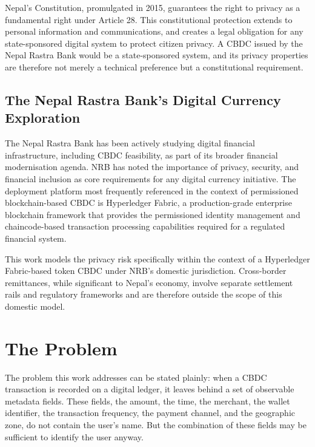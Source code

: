 Nepal's Constitution, promulgated in 2015, guarantees the
right to privacy as a fundamental right under Article 28.
This constitutional protection extends to personal
information and communications, and creates a legal
obligation for any state-sponsored digital system to
protect citizen privacy. A CBDC issued by the Nepal Rastra
Bank would be a state-sponsored system, and its privacy
properties are therefore not merely a technical preference
but a constitutional requirement.

\subsection{The Nepal Rastra Bank's Digital Currency Exploration}

The Nepal Rastra Bank has been actively studying digital
financial infrastructure, including CBDC feasibility, as
part of its broader financial modernisation agenda. NRB
has noted the importance of privacy, security, and
financial inclusion as core requirements for any digital
currency initiative. The deployment platform most
frequently referenced in the context of permissioned
blockchain-based CBDC is Hyperledger Fabric, a
production-grade enterprise blockchain framework that
provides the permissioned identity management and
chaincode-based transaction processing capabilities
required for a regulated financial system.

This work models the privacy risk specifically within
the context of a Hyperledger Fabric-based token CBDC
under NRB's domestic jurisdiction. Cross-border
remittances, while significant to Nepal's economy,
involve separate settlement rails and regulatory
frameworks and are therefore outside the scope of this
domestic model.

\section{The Problem}
\label{sec:problem}

The problem this work addresses can be stated plainly:
when a CBDC transaction is recorded on a digital ledger,
it leaves behind a set of observable metadata fields.
These fields, the amount, the time, the merchant, the
wallet identifier, the transaction frequency, the payment
channel, and the geographic zone, do not contain the
user's name. But the combination of these fields may be
sufficient to identify the user anyway.

